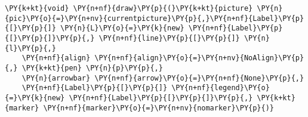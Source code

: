 \begin{Verbatim}[commandchars=\\\{\}]
    \PY{k+kt}{void} \PY{n+nf}{draw}\PY{p}{(}\PY{k+kt}{picture} \PY{n}{pic}\PY{o}{=}\PY{n+nv}{currentpicture}\PY{p}{,}\PY{n+nf}{Label}\PY{p}{[}\PY{p}{]} \PY{n}{L}\PY{o}{=}\PY{k}{new} \PY{n+nf}{Label}\PY{p}{[}\PY{p}{]}\PY{p}{,} \PY{n+nf}{line}\PY{p}{[}\PY{p}{]} \PY{n}{l}\PY{p}{,}
    \PY{n+nf}{align} \PY{n+nf}{align}\PY{o}{=}\PY{n+nv}{NoAlign}\PY{p}{,} \PY{k+kt}{pen} \PY{n}{p}\PY{p}{,}
    \PY{n}{arrowbar} \PY{n+nf}{arrow}\PY{o}{=}\PY{n+nf}{None}\PY{p}{,}
    \PY{n+nf}{Label}\PY{p}{[}\PY{p}{]} \PY{n+nf}{legend}\PY{o}{=}\PY{k}{new} \PY{n+nf}{Label}\PY{p}{[}\PY{p}{]}\PY{p}{,} \PY{k+kt}{marker} \PY{n+nf}{marker}\PY{o}{=}\PY{n+nv}{nomarker}\PY{p}{)}
\end{Verbatim}
